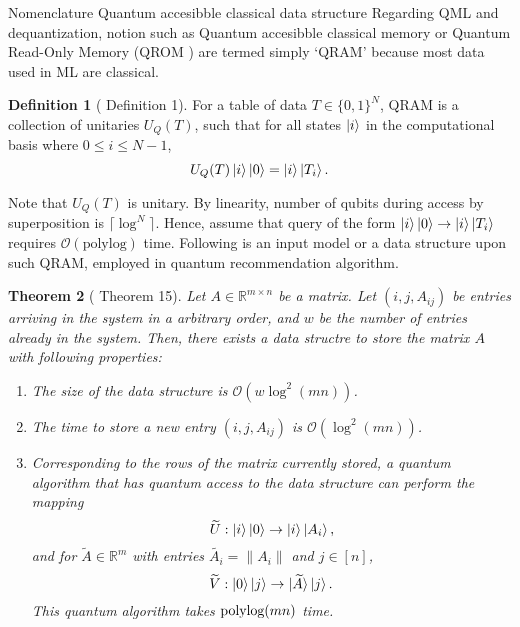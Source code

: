 \documentclass[10pt,twoside,reqno]{amsart} %
\makeatletter
\renewcommand{\section}{\@startsection{section}{1}
   \z@{.7\linespacing\@plus\linespacing}{.5\linespacing}
   {\normalfont\upshape\bfseries\centering}}
\theoremstyle{plain}
\newtheorem{thm}{Theorem}[section]
\theoremstyle{definition}
\newtheorem{defn}[thm]{Definition}
\makeatother
\begin{document}
\section{Nomenclature}
\section{Quantum accesibble classical data structure}
Regarding QML and dequantization, notion such as Quantum accesibble classical
memory or Quantum Read-Only Memory (QROM \cite{babbush2018}) are termed simply
`QRAM' because most data used in ML are classical. 

\begin{defn}[\cite{jaques2023} Definition 1]
  For a table of data $T\in\{0,1\}^N$, 
  QRAM is a collection of unitaries $U_Q(T)$,
  such that for all states $\ket{i}$ in the computational basis
  where $0\leq i\leq N-1$, 
  \[
    U_Q(T)\ket{i}\ket{0} = \ket{i}\ket{T_i}.
  \]
\end{defn}
Note that $U_Q(T)$ is unitary. By linearity, number of qubits during access
by superposition is $\lceil\log^N\rceil$. Hence, assume that query of the
form $\ket{i}\ket{0}\rightarrow\ket{i}\ket{T_i}$ requires 
$\mathcal{O}(\textrm{polylog})$ time. Following is an input model or a data
structure upon such QRAM, employed in quantum recommendation algorithm.
\begin{thm}[\cite{kerenidis2017} Theorem 15]
  Let $A\in\mathbb{R}^{m\times n}$ be a matrix. Let $(i,j,A_{ij})$ be 
  entries arriving in the system in a arbitrary order, and $w$ be the
  number of entries already in the system. Then, there exists a data structre
  to store the matrix $A$ with following properties:
  \begin{enumerate}
    \item The size of the data structure is $\mathcal{O}(w\log^2(mn))$.
    \item The time to store a new entry $(i,j,A_{ij})$ is 
      $\mathcal{O}(\log^2(mn))$.
    \item Corresponding to the rows of the matrix currently stored,
      a quantum algorithm that has quantum access to the data structure
      can perform the mapping 
      \[
        \widetilde{U}:\ket{i}\ket{0}\rightarrow\ket{i}\ket{A_i},
      \]
      and for $\widetilde{A}\in\mathbb{R}^m$ with entries 
      $\widetilde{A_i}=\|A_i\|$ and $j\in[n]$,
      \[
        \widetilde{V}:\ket{0}\ket{j}\rightarrow\ket{\widetilde{A}}\ket{j}.
      \]
      This quantum algorithm takes $\textrm{\normalfont polylog}(mn)$ time.
  \end{enumerate}
\end{thm}
\end{document}
